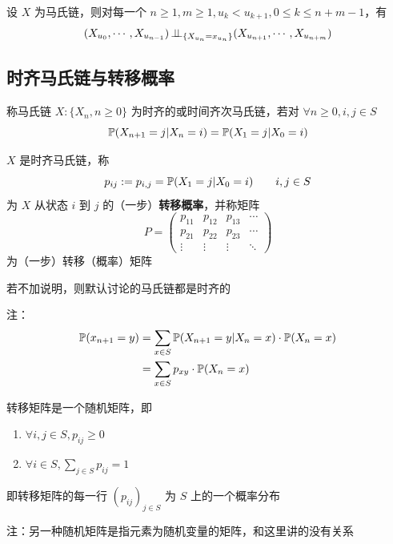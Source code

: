 \begin{corollary}
    设 $X$ 为马氏链，则对每一个 $n\geq 1,m\geq 1, u_k<u_{k+1}, 0\leq k\leq n+m-1$，有
    \[
    (X_{u_0},\cdots,X_{u_{n-1}})\operatorname{\perp\!\!\!\perp}_{\{X_{u_n}=x_{u_n}\}}(X_{u_{n+1}},\cdots,X_{u_{n+m}})
    \]
\end{corollary}

\subsection{时齐马氏链与转移概率}

\begin{definition}[时间齐次马氏链]
    称马氏链 $X:\{X_n,n\geq 0\}$ 为时齐的或时间齐次马氏链，若对 $\forall n\geq 0, i,j\in S$
    \[
    \mathbb{P}(X_{n+1}=j|X_n=i)=\mathbb{P}(X_1=j|X_0=i)
    \]
\end{definition}

\begin{definition}
    $X$ 是时齐马氏链，称
    \[
    p_{ij}:=p_{i,j}=\mathbb{P}(X_1=j|X_0=i)\qquad i,j\in S
    \]
    为 $X$ 从状态 $i$ 到 $j$ 的（一步）\textbf{转移概率}，并称矩阵
    \[
    P=\begin{pmatrix}
        p_{11} & p_{12} & p_{13} & \cdots\\
        p_{21} & p_{22} & p_{23} & \cdots\\
        \vdots & \vdots & \vdots & \ddots
    \end{pmatrix}
    \]
    为（一步）转移（概率）矩阵
\end{definition}

若不加说明，则默认讨论的马氏链都是时齐的

注：
\[
\begin{aligned}
    \mathbb{P}(x_{n+1}=y)&=\sum_{x\in S}\mathbb{P}(X_{n+1}=y|X_n=x)\cdot \mathbb{P}(X_n=x)\\
    &=\sum_{x\in S}p_{xy}\cdot \mathbb{P}(X_n=x)
\end{aligned}
\]

\begin{theorem}[转移矩阵的刻画]\label{thm:random_matrix}
    转移矩阵是一个随机矩阵，即
    \begin{enumerate}
        \item $\forall i,j\in S,p_{ij}\geq 0$
        \item $\forall i\in S,\sum_{j\in S}p_{ij}=1$
    \end{enumerate}
    即转移矩阵的每一行 $(p_{ij})_{j\in S}$ 为 $S$ 上的一个概率分布

    注：另一种随机矩阵是指元素为随机变量的矩阵，和这里讲的没有关系
\end{theorem}

